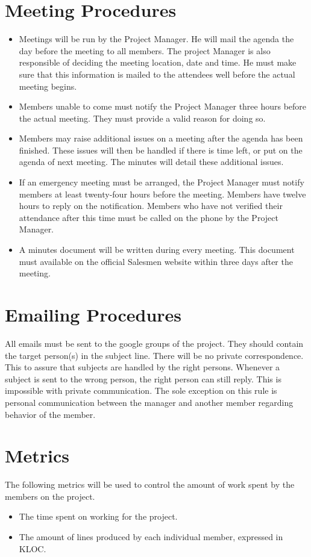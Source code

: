 \documentclass[salesmen, twoside]{../../../templates/latex/2009/softproj}
\begin{document}
\begin{projdoc}
\section{Meeting Procedures}
\begin{itemize}
\item
Meetings will be run by the Project Manager. He will mail the agenda the day before the meeting to all members. The project Manager is also responsible of deciding the meeting location, date and time. He must make sure that this information is mailed to the attendees well before the actual meeting begins.
\item
Members unable to come must notify the Project Manager three hours before the actual meeting. They must provide a valid reason for doing so.
\item
Members may raise additional issues on a meeting after the agenda has been finished. These issues will then be handled if there is time left, or put on the agenda of next meeting. The minutes will detail these additional issues.
\item
If an emergency meeting must be arranged, the Project Manager must notify members at least twenty-four hours before the meeting. Members have twelve hours to reply on the notification. Members who have not verified their attendance after this time must be called on the phone by the Project Manager.
\item
A minutes document will be written during every meeting. This document must available on the official Salesmen website within three days after the meeting.
\end{itemize}

\section{Emailing Procedures}
All emails must be sent to the google groups of the project. They should contain the target person(s) in the subject line. There will be no private correspondence. This to assure that subjects are handled by the right persons. Whenever a subject is sent to the wrong person, the right person can still reply. This is impossible with private communication. The sole exception on this rule is personal communication between the manager and another member regarding behavior of the member.

\section{Metrics}
The following metrics will be used to control the amount of work spent by the members on the project.
\begin{itemize}
\item The time spent on working for the project.
\item The amount of lines produced by each individual member, expressed in KLOC.
\end{itemize}


\end{projdoc}
\end{document}

